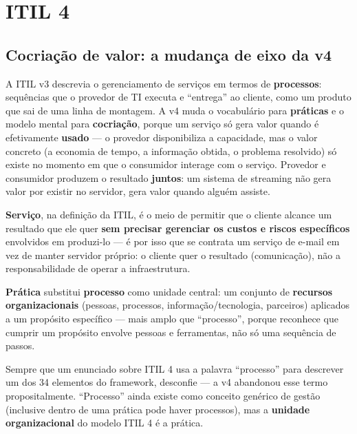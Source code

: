\section{ITIL 4}
\label{sec:itil4-teoria}

\subsection{Cocriação de valor: a mudança de eixo da v4}

\begin{conceito}
A ITIL v3 descrevia o gerenciamento de serviços em termos de
\textbf{processos}: sequências que o provedor de TI executa e “entrega” ao
cliente, como um produto que sai de uma linha de montagem. A v4 muda o
vocabulário para \textbf{práticas} e o modelo mental para
\textbf{cocriação}, porque um serviço só gera valor quando é efetivamente
\textbf{usado} --- o provedor disponibiliza a capacidade, mas o valor
concreto (a economia de tempo, a informação obtida, o problema resolvido)
só existe no momento em que o consumidor interage com o serviço. Provedor e
consumidor produzem o resultado \textbf{juntos}: um sistema de streaming não
gera valor por existir no servidor, gera valor quando alguém assiste.

\textbf{Serviço}, na definição da ITIL, é o meio de permitir que o cliente
alcance um resultado que ele quer \textbf{sem precisar gerenciar os custos e
riscos específicos} envolvidos em produzi-lo --- é por isso que se contrata
um serviço de e-mail em vez de manter servidor próprio: o cliente quer o
resultado (comunicação), não a responsabilidade de operar a infraestrutura.

\textbf{Prática} substitui \textbf{processo} como unidade central: um
conjunto de \textbf{recursos organizacionais} (pessoas, processos,
informação/tecnologia, parceiros) aplicados a um propósito específico ---
mais amplo que “processo”, porque reconhece que cumprir um propósito
envolve pessoas e ferramentas, não só uma sequência de passos.
\end{conceito}

\begin{cuidado}
Sempre que um enunciado sobre ITIL 4 usa a palavra “processo” para descrever
um dos 34 elementos do framework, desconfie --- a v4 abandonou esse termo
propositalmente. “Processo” ainda existe como conceito genérico de gestão
(inclusive dentro de uma prática pode haver processos), mas a \textbf{unidade
organizacional} do modelo ITIL 4 é a prática.
\end{cuidado}

